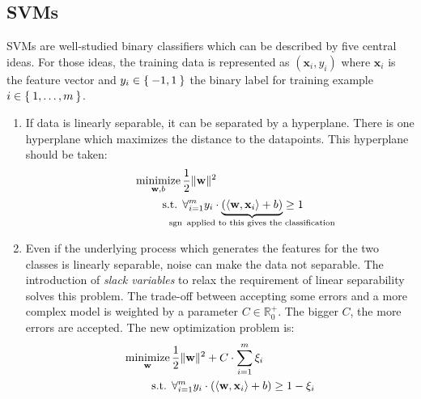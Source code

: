 
\subsection{SVMs}\label{subsec:trad-SVM}%

\Glspl{SVM} are well-studied binary classifiers which can be described by five
central ideas. For those ideas, the training data is represented as
$(\mathbf{x}_i, y_i)$ where $\mathbf{x}_i$ is the feature vector and $y_i \in
\Set{-1, 1}$ the binary label for training example $i \in \Set{1, \dots, m}$.


\begin{enumerate}
    \item If data is linearly separable, it can be separated by a hyperplane.
          There is one hyperplane which maximizes the distance to the
          datapoints. This hyperplane should be taken:\\
          \begin{equation*}
          \begin{aligned}
              \minimize_{\mathbf{w}, b}\,&\frac{1}{2} \|\mathbf{w}\|^2\\
              \text{s.t. }& \forall_{i=1}^m y_i \cdot \underbrace{(\langle \mathbf{w}, \mathbf{x}_i\rangle + b)}_{\mathclap{\sgn \text{ applied to this gives the classification}}} \geq 1
          \end{aligned}
          \end{equation*}
    \item Even if the underlying process which generates the features for the
          two classes is linearly separable, noise can make the data not
          separable. The introduction of \textit{slack variables} to relax the
          requirement of linear separability solves this problem. The trade-off
          between accepting some errors and a more complex model is weighted by
          a parameter $C \in \mathbb{R}_0^+$. The bigger $C$, the more errors
          are accepted. The new optimization problem is:
          \begin{equation*}
          \begin{aligned}
              \operatorname*{minimize}_{\mathbf{w}}\,&\frac{1}{2} \|\mathbf{w}\|^2 + C \cdot \sum_{i=1}^m \xi_i\\
              \text{s.t. }& \forall_{i=1}^m y_i \cdot (\langle \mathbf{w}, \mathbf{x}_i\rangle + b) \geq 1 - \xi_i
          \end{aligned}
          \end{equation*}

\end{enumerate}
